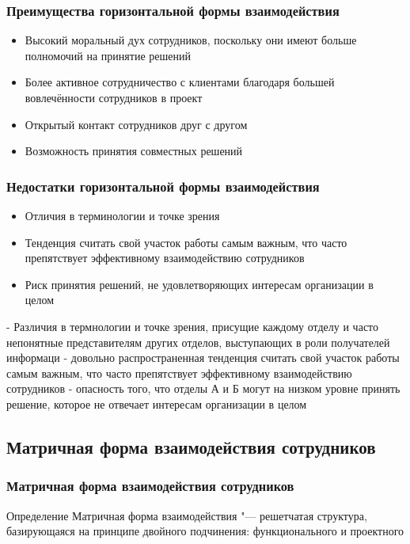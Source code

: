 \documentclass{../industrial-development}
\begin{document}
\begin{frame} \frametitle{Преимущества горизонтальной формы взаимодействия}
  
  \begin{itemize}
  \item Высокий моральный дух сотрудников, поскольку они имеют больше полномочий на принятие решений
  \item Более активное сотрудничество с клиентами благодаря большей вовлечённости сотрудников в проект
  \item Открытый контакт сотрудников друг с другом
  \item Возможность принятия совместных решений
  \end{itemize}
\end{frame}

\begin{frame} \frametitle{Недостатки горизонтальной формы взаимодействия}
	
	\begin{itemize}
		\item Отличия в терминологии и точке зрения
		\item Тенденция считать свой участок работы самым важ­ным, что часто препятствует эффективному взаимодей­ствию сотрудников
		\item Риск принятия решений, не удовлетворяющих интересам организации в целом
	\end{itemize}
\end{frame}

\lecturenotes
- Различия в термнологии и точке зрения, присущие каждому отде­лу и часто непонятные представителям других отделов, вы­ступающих в роли получателей информаци
- довольно распространен­ная тенденция считать свой участок работы самым важ­ным, что часто препятствует эффективному взаимодей­ствию сотрудников
- опасность того, что отделы А и Б могут на низком уровне принять решение, которое не отвечает интересам организации в целом

\subsection{Матричная форма взаимодействия сотрудников}

\begin{frame} \frametitle{Матричная форма взаимодействия сотрудников}
  \begin{block}{Определение}
	\alert{Матричная форма взаимодействия} "--- решетчатая структура, базирующаяся на принципе  двойного подчинения: функционального и проектного
  \end{block}
\end{frame}
\end{document}
